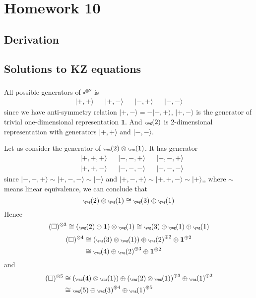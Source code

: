 \newpage
\section{Homework 10}
\subsection{Derivation}

\subsection{Solutions to KZ equations}
\subsubsection{}
All possible generators of $\square^{\otimes2}$ is 
\[
\begin{aligned}
|+,+\rangle & & |+,- \rangle & & |-,+\rangle & & |-,-\rangle
\end{aligned}
\]
since we have anti-symmetry relation $|+,-\rangle = -|-,+\rangle$, $|+,-\rangle$ is the generator of trivial one-dimensional representation $\mathbf{1}$. And ${\tiny\yng(2)}$ is 2-dimensional representation with generators $|+,+\rangle$ and $|-,-\rangle$.

Let us consider the generator of ${\tiny\yng(2)} \otimes {\tiny\yng(1)}$. It has generator
\[
\begin{aligned}
&|+,+,+\rangle& & |-,-,+\rangle& & |+,-,+\rangle\\
&|+,+,-\rangle& & |-,-,-\rangle& & |+,-,-\rangle
\end{aligned}
\]
since $|-,-,+\rangle \sim |+,-,-\rangle \sim |-\rangle$ and $|+,-,+ \rangle \sim |+,+,-\rangle \sim |+\rangle$,, where $\sim$ means linear equivalence, we can conclude that 
\begin{equation}
	{\tiny\yng(2)} \otimes {\tiny\yng(1)} \cong {\tiny\yng(3)} \oplus {\tiny\yng(1)}
\end{equation}
Hence
\begin{equation}
	(\square)^{\otimes 3} \cong \left( {\tiny\yng(2)} \oplus \mathbf{1} \right) \otimes {\tiny\yng(1)} \cong {\tiny\yng(3)} \oplus {\tiny\yng(1)} \oplus {\tiny\yng(1)}
\end{equation}
\begin{equation}
	\begin{split}
	(\square)^{\otimes 4} &\cong \left({\tiny\yng(3)} \otimes {\tiny\yng(1)}\right) \oplus {\tiny\yng(2)}^{\oplus 2} \oplus \mathbf{1}^{\oplus 2}\\
	&\cong {\tiny\yng(4)} \oplus {\tiny\yng(2)}^{\oplus 3} \oplus \mathbf{1}^{\oplus 2}
	\end{split}
\end{equation}
and
\begin{equation}
	\begin{split}
	(\square)^{\otimes 5} &\cong \left({\tiny\yng(4)} \otimes {\tiny\yng(1)}\right) \oplus \left({\tiny\yng(2)} \otimes {\tiny\yng(1)}\right)^{\oplus 3} \oplus {\tiny\yng(1)}^{\oplus 2}\\
	&\cong {\tiny\yng(5)} \oplus {\tiny\yng(3)}^{\oplus 4} \oplus {\tiny\yng(1)}^{\oplus 5}
	\end{split}
\end{equation}
